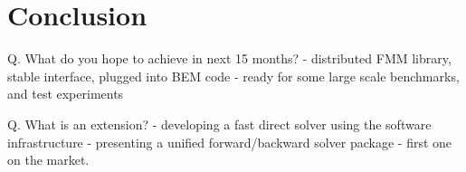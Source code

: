 \chapter{Conclusion}\label{chpt:conclusion}




Q. What do you hope to achieve in next 15 months?
    - distributed FMM library, stable interface, plugged into BEM code
    - ready for some large scale benchmarks, and test experiments

Q. What is an extension?
    - developing a fast direct solver using the software infrastructure
        - presenting a unified forward/backward solver package
            - first one on the market.
